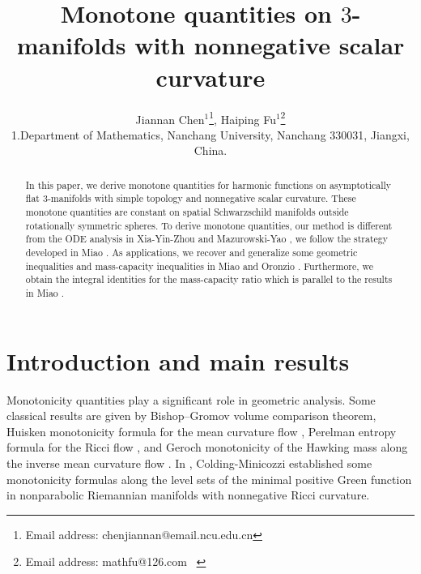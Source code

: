 \documentclass[12pt]{article}
\theoremstyle{definition}
\theoremstyle{plain}
\numberwithin{equation}{section}
\begin{document}
	\title{\bf Monotone quantities on $3$-manifolds with nonnegative scalar curvature }
	
		
 \author{Jiannan Chen$^{1}$\footnote{Email address: chenjiannan@email.ncu.edu.cn}, Haiping Fu$^{1}$\footnote{Email address: mathfu@126.com\,\,\    
 	}\\
 	{\small 1.Department of Mathematics,  Nanchang University,} {\small Nanchang 330031, Jiangxi, China.} 
    \\
}   

	
	
\date{}

\maketitle
\begin{abstract}
In this paper, we derive monotone quantities for harmonic functions on asymptotically flat 3-manifolds with simple topology and nonnegative scalar curvature. These monotone quantities are constant
on spatial Schwarzschild manifolds outside rotationally symmetric spheres. To derive monotone quantities, our method is different from the ODE analysis in Xia-Yin-Zhou \cite{Xia} and Mazurowski-Yao \cite{Maz}, we follow the strategy developed in Miao \cite{Miao}. As applications, we recover and generalize some geometric inequalities and  mass-capacity inequalities in Miao \cite{Miao} and Oronzio \cite{Oronzio}. Furthermore, we obtain the integral identities for the mass-capacity ratio which is parallel to the results in Miao \cite{Miao}.   
\end{abstract}	

	


\section{\bf Introduction and main results}
Monotonicity quantities play a significant role in geometric analysis.  
Some classical results are given by Bishop–Gromov volume comparison theorem, Huisken monotonicity formula for the mean curvature flow \cite{Huisken1}, Perelman entropy formula for the Ricci flow \cite{Perelman}, and Geroch monotonicity of the Hawking mass along the inverse mean curvature flow \cite{Huisken2}. In \cite{Cold1,Cold2,Cold3}, Colding-Minicozzi established some monotonicity formulas along the level sets of the minimal positive Green function in nonparabolic Riemannian manifolds with nonnegative Ricci curvature. 
\end{document}
